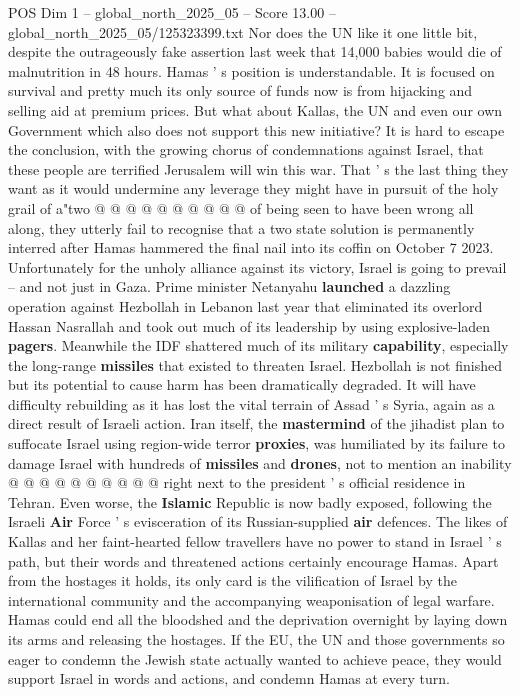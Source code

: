 \begin{textsample}{POS Dim 1 – global\_north\_2025\_05 – Score 13.00 – global\_north\_2025\_05/125323399.txt}
Nor does the UN like it one little bit, despite the outrageously fake assertion last week that 14,000 babies would die of malnutrition in 48 hours.
Hamas ' s position is understandable.
It is focused on survival and pretty much its only source of funds now is from hijacking and selling aid at premium prices.
But what about Kallas, the UN and even our own Government which also does not support this new initiative?
It is hard to escape the conclusion, with the growing chorus of condemnations against Israel, that these people are terrified Jerusalem will win this war.
That ' s the last thing they want as it would undermine any leverage they might have in pursuit of the holy grail of a"two @ @ @ @ @ @ @ @ @ @ of being seen to have been wrong all along, they utterly fail to recognise that a two state solution is permanently interred after Hamas hammered the final nail into its coffin on October 7 2023.
Unfortunately for the unholy alliance against its victory, Israel is going to prevail -- and not just in Gaza.
Prime minister Netanyahu \textbf{launched} a dazzling operation against Hezbollah in Lebanon last year that eliminated its overlord Hassan Nasrallah and took out much of its leadership by using explosive-laden \textbf{pagers}.
Meanwhile the IDF shattered much of its military \textbf{capability}, especially the long-range \textbf{missiles} that existed to threaten Israel.
Hezbollah is not finished but its potential to cause harm has been dramatically degraded.
It will have difficulty rebuilding as it has lost the vital terrain of Assad ' s Syria, again as a direct result of Israeli action.
Iran itself, the \textbf{mastermind} of the jihadist plan to suffocate Israel using region-wide terror \textbf{proxies}, was humiliated by its failure to damage Israel with hundreds of \textbf{missiles} and \textbf{drones}, not to mention an inability @ @ @ @ @ @ @ @ @ @ right next to the president ' s official residence in Tehran.
Even worse, the \textbf{Islamic} Republic is now badly exposed, following the Israeli \textbf{Air} Force ' s evisceration of its Russian-supplied \textbf{air} defences.
The likes of Kallas and her faint-hearted fellow travellers have no power to stand in Israel ' s path, but their words and threatened actions certainly encourage Hamas.
Apart from the hostages it holds, its only card is the vilification of Israel by the international community and the accompanying weaponisation of legal warfare.
Hamas could end all the bloodshed and the deprivation overnight by laying down its arms and releasing the hostages.
If the EU, the UN and those governments so eager to condemn the Jewish state actually wanted to achieve peace, they would support Israel in words and actions, and condemn Hamas at every turn.

\end{textsample}
